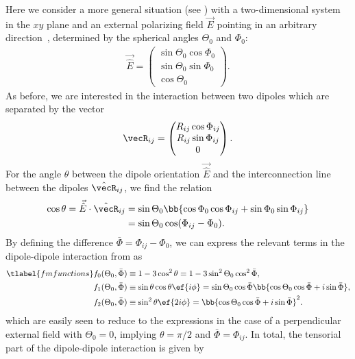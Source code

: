 Here we consider a more general situation (see ) with a two-dimensional system in the $xy$ plane and an external polarizing field $\vec{E}$ pointing in an arbitrary direction~\cite{Gorshkov2011c}, determined by the spherical angles $\Theta_0$ and $\Phi_0$:
\begin{align}
    \vec{\hat{E}}=\begin{pmatrix}
        \sin\Theta_0\cos\Phi_0 \\
        \sin\Theta_0\sin\Phi_0 \\
        \cos\Theta_0
    \end{pmatrix}.
\end{align}
As before, we are interested in the interaction between two dipoles which are separated
by the vector
\begin{align}
\vecR_{ij} = \begin{pmatrix}R_{ij} \cos\Phi_{ij} \\ R_{ij} \sin\Phi_{ij} \\ 0\end{pmatrix}.
\end{align}
For the angle $\theta$ between the dipole orientation $\vec{\hat{E}}$ and the interconnection line between the dipoles $\hat{\vecR}_{ij}$, we find the relation
\begin{align}
    \cos\theta = \vec{\hat{E}} \cdot \hat{\vecR}_{ij} &= \sin\Theta_0\bb{\cos\Phi_0\cos\Phi_{ij}+\sin\Phi_0\sin\Phi_{ij}}\\
                                                      &=\sin\Theta_0\cos(\Phi_{ij}-\Phi_0).
\end{align}
By defining the difference $\bar\Phi=\Phi_{ij}-\Phi_0$, we can express the relevant terms in the dipole-dipole interaction from  as
\begin{align} \tlabel{fmfunctions}
    f_0(\Theta_0, \bar \Phi)&\equiv 1-3\cos^2\theta = 1-3\sin^2\Theta_0\cos^2\bar\Phi, \vphantom{\bb{\bar \Phi}} \\
    f_1(\Theta_0, \bar \Phi)&\equiv \sin\theta\cos\theta \ef{i\phi} = \sin\Theta_0 \cos\bar\Phi \bb{\cos\Theta_0 \cos\bar\Phi + i \sin \bar\Phi}, \\
    f_2(\Theta_0, \bar \Phi)&\equiv\sin^2\theta \ef{2i\phi} = \bb{\cos\Theta_0 \cos\bar\Phi + i \sin \bar\Phi}^2.
\end{align}
which are easily seen to reduce to the expressions  in the case of a perpendicular external field with $\Theta_0=0$, implying $\theta=\pi/2$ and $\bar\Phi=\Phi_{ij}$.
In total, the tensorial part of the dipole-dipole interaction is given by
